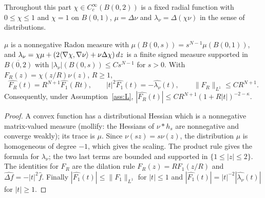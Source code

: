 Throughout this part $\chi\in C_c^\infty(B(0,2))$ is a fixed radial function with $0\le\chi\le1$ and $\chi=1$ on $B(0,1)$,
$\mu=\Delta\nu$ and $\lambda_\nu=\Delta(\chi\nu)$ in the sense of distributions.

\begin{lemma}\label{lem:lapmeasure}
$\mu$ is a nonnegative Radon measure with $\mu(B(0,s))=s^{N-1}\mu(B(0,1))$, and
$\lambda_\nu=\chi\mu+(2\langle \nabla\chi, \nabla\nu\rangle+\nu\Delta\chi)\,dz$ is a finite signed measure supported in
$\overline{B(0,2)}$ with $|\lambda_\nu|(B(0,s))\le Cs^{N-1}$ for $s>0$. With $F_R(z)=\chi(z/R)\nu(z)$, $R\ge1$,
\[
\widehat{F_R}(t)=R^{N+1}\widehat{F_1}(Rt),\qquad|t|^2\widehat{F_1}(t)=-\widehat{\lambda_\nu}(t),\qquad
\|F_R\|_{L^1}\le CR^{N+1}.
\]
Consequently, under Assumption~\ref{ass:L}, $|\widehat{F_R}(t)|\le CR^{N+1}(1+R|t|)^{-2-\kappa}$.
\end{lemma}
\begin{proof}
A convex function has a distributional Hessian which is a nonnegative matrix-valued measure (mollify: the Hessians of
$\nu*h_s$ are nonnegative and converge weakly); its trace is $\mu$. Since $\nu(sz)=s\nu(z)$, the distribution $\mu$ is
homogeneous of degree $-1$, which gives the scaling. The product rule gives the formula for $\lambda_\nu$; the two
last terms are bounded and supported in $\{1\le|z|\le2\}$. The identities for $F_R$ are the dilation rule
$F_R(z)=RF_1(z/R)$ and $\widehat{\Delta f}=-|t|^2\widehat f$. Finally $|\widehat{F_1}(t)|\le\|F_1\|_{L^1}$ for $|t|\le1$
and $|\widehat{F_1}(t)|=|t|^{-2}|\widehat{\lambda_\nu}(t)|$ for $|t|\ge1$.
\end{proof}

